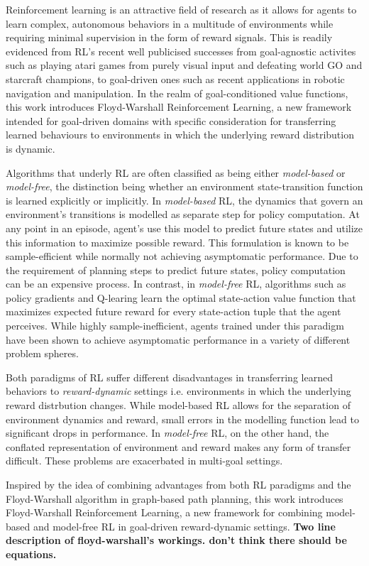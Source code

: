 Reinforcement learning is an attractive field of research as it allows
for agents to learn complex, autonomous behaviors in a multitude of
environments while requiring minimal supervision in the form of reward
signals. This is readily evidenced from RL's recent well publicised
successes from goal-agnostic activites such as playing atari games from
purely visual input and  defeating world GO and starcraft champions, to
goal-driven ones such as recent applications in robotic navigation and
manipulation. In the realm of goal-conditioned value functions, this
work introduces Floyd-Warshall Reinforcement Learning, a new framework
intended for goal-driven domains with specific consideration for
transferring learned behaviours to environments in which the underlying
reward distribution is dynamic.

Algorithms that underly RL are often classified as being either
\emph{model-based} or \emph{model-free}, the distinction being whether
an environment state-transition function is learned explicitly or
implicitly.  In \emph{model-based} RL, the dynamics that govern an
environment's transitions is modelled as separate step for policy
computation. At any point in an episode, agent's use this model to
predict future states and utilize this information to maximize possible
reward. This formulation is known to be sample-efficient while normally
not achieving asymptomatic performance.  Due to the requirement of
planning steps to predict future states, policy computation can be an
expensive process. In contrast, in \emph{model-free} RL, algorithms such
as policy gradients and Q-learing learn the optimal state-action value
function that maximizes expected future reward for every state-action
tuple that the agent perceives.  While highly sample-inefficient, agents
trained under this paradigm have been shown to achieve asymptomatic
performance in a variety of different problem spheres.

Both paradigms of RL suffer different disadvantages in transferring
learned behaviors to \emph{reward-dynamic} settings i.e.  environments
in which the underlying reward distrbution changes.  While model-based
RL allows for the separation of environment dynamics and reward, small
errors in the modelling function lead to significant drops in
performance. In \emph{model-free} RL, on the other hand, the conflated
representation of environment and reward makes any form of transfer
difficult. These problems are exacerbated in multi-goal settings. 

Inspired by the idea of combining advantages from both RL paradigms and
the Floyd-Warshall algorithm in graph-based path planning, this work
introduces Floyd-Warshall Reinforcement Learning, a new framework for
combining model-based and model-free RL in goal-driven reward-dynamic
settings. \textbf{Two line description of floyd-warshall's workings.
don't think there should be equations.}

